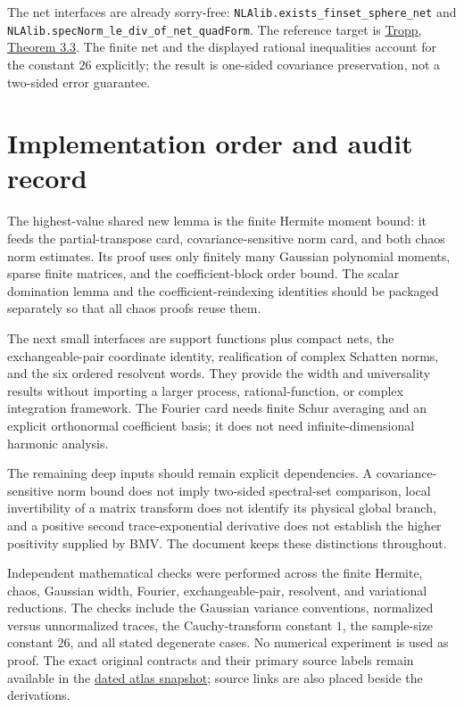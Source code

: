 \documentclass[11pt,a4paper]{article}
\DeclareRobustCommand{\code}[1]{{\footnotesize\urlstyle{tt}\nolinkurl{#1}}}
\begin{document}
The net interfaces are already sorry-free:
\code{NLAlib.exists_finset_sphere_net} and
\code{NLAlib.specNorm_le_div_of_net_quadForm}.
The reference target is
\href{https://arxiv.org/html/2603.04365v5#S3.SS3}{Tropp, Theorem 3.3}.
The finite net and the displayed rational inequalities account for the
constant $26$ explicitly; the result is one-sided covariance preservation,
not a two-sided error guarantee.

\section*{Implementation order and audit record}
The highest-value shared new lemma is the finite Hermite moment bound:
it feeds the partial-transpose card, covariance-sensitive norm card, and
both chaos norm estimates. Its proof uses only finitely many Gaussian
polynomial moments, sparse finite matrices, and the coefficient-block
order bound. The scalar domination lemma and the coefficient-reindexing
identities should be packaged separately so that all chaos proofs reuse them.

The next small interfaces are support functions plus compact nets, the
exchangeable-pair coordinate identity, realification of complex Schatten
norms, and the six ordered resolvent words. They provide the width and
universality results without importing a larger process, rational-function,
or complex integration framework. The Fourier card needs finite Schur
averaging and an explicit orthonormal coefficient basis; it does not need
infinite-dimensional harmonic analysis.

The remaining deep inputs should remain explicit dependencies. A
covariance-sensitive norm bound does not imply two-sided spectral-set
comparison, local invertibility of a matrix transform does not identify
its physical global branch, and a positive second trace-exponential
derivative does not establish the higher positivity supplied by BMV.
The document keeps these distinctions throughout.

Independent mathematical checks were performed across the finite Hermite,
chaos, Gaussian width, Fourier, exchangeable-pair, resolvent, and variational
reductions. The checks include the Gaussian variance conventions, normalized
versus unnormalized traces, the Cauchy-transform constant $1$, the sample-size
constant $26$, and all stated degenerate cases. No numerical experiment is
used as proof. The exact original contracts and their primary source labels
remain available in the
\href{https://github.com/tchen-research/NLAlib/blob/faef0a270d762f0bf0e90603544d50f289873d0e/atlas/atlas.json}
{dated atlas snapshot}; source links are also placed beside the derivations.
\end{document}
